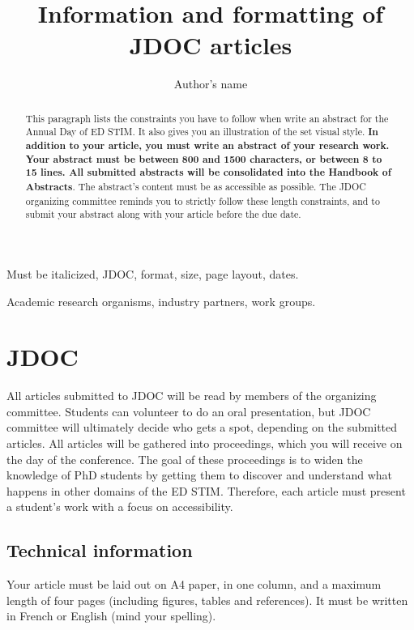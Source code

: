 \documentclass[en]{jdoc}
\title{Information and formatting of JDOC articles}
\author{Author’s name}
\begin{document}
\makehead %

\begin{abstract}
  This paragraph lists the constraints you have to follow when write
  an abstract for the Annual Day of ED STIM.  It also gives you an
  illustration of the set visual style.  \textbf{In addition to your
    article, you must write an abstract of your research work.  Your
    abstract must be between 800 and 1500 characters, or between 8 to
    15 lines.  All submitted abstracts will be consolidated into the
    Handbook of Abstracts}.  The abstract’s content must be as
  accessible as possible.  The JDOC organizing committee reminds you
  to strictly follow these length constraints, and to submit your
  abstract along with your article before the due date.
\end{abstract}

\begin{keywords}
Must be italicized, JDOC, format, size, page layout, dates.
\end{keywords}

\begin{collaborations}
Academic research organisms, industry partners, work groups.
\end{collaborations}

\section{JDOC}
All articles submitted to JDOC will be read by members of the
organizing committee.  Students can volunteer to do an oral
presentation, but JDOC committee will ultimately decide who gets a
spot, depending on the submitted articles.  All articles will be
gathered into proceedings, which you will receive on the day of the
conference.  The goal of these proceedings is to widen the knowledge
of PhD students by getting them to discover and understand what
happens in other domains of the ED STIM.  Therefore, each article must
present a student’s work with a focus on accessibility.

\subsection{Technical information}
Your article must be laid out on A4 paper, in one column, and a
maximum length of four pages (including figures, tables and
references).  It must be written in French or English (mind your
spelling).
\end{document}
